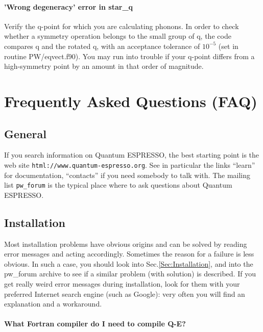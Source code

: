 \documentclass[12pt,a4paper]{article}
\def\qe{{\sc Quantum ESPRESSO}}
\begin{document}
\paragraph{'Wrong degeneracy' error in star\_q}
Verify the q-point for which you are calculating phonons. In order to
check whether a symmetry operation belongs to the small group of q,
the code compares q and the rotated q, with an acceptance tolerance of  
$10^{-5}$ (set in routine PW/eqvect.f90). You may run into trouble if
your q-point differs from a high-symmetry point by an amount in that
order of magnitude.

\section{Frequently Asked Questions (FAQ)}

\subsection{General}

If you search information on \qe, the best starting point is the web site 
\texttt{html://www.quantum-espresso.org}. See in particular the
links ``learn'' for documentation, ``contacts'' if you need 
somebody to talk with. The mailing list \texttt{pw\_forum} is
the typical place where to ask questions about \qe.


\subsection{Installation}

Most installation problems have obvious origins and can be solved by reading
error messages and acting accordingly. Sometimes the reason for a failure
is less obvious. In such a case, you should look into 
Sec.\ref{Sec:Installation}, and into the pw\_forum archive to
see if a similar problem (with solution) is described. If you get
really weird error messages during installation, look for them with
your preferred Internet search engine (such as Google): very often you
will find an explanation and a workaround. 

\paragraph{What Fortran compiler do I need to compile Q-E?}
\end{document}
